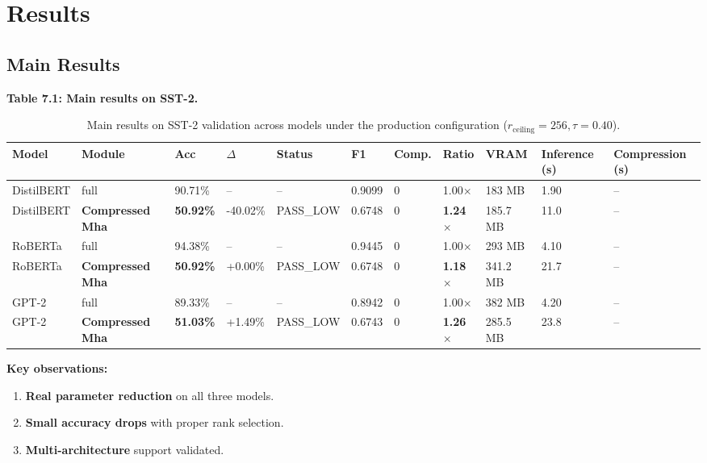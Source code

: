 \section{Results}

\subsection{Main Results}

\textbf{Table 7.1: Main results on SST-2.}

\begin{table}[t]
\centering
\small
\begin{tabular}{lllllllllll}
\toprule
\textbf{Model} & \textbf{Module} & \textbf{Acc} & \textbf{$\Delta$} & \textbf{Status} & \textbf{F1} & \textbf{Comp.} & \textbf{Ratio} & \textbf{VRAM} & \textbf{Inference (s)} & \textbf{Compression (s)} \\
\midrule
DistilBERT & full & 90.71\% & -- & -- & 0.9099 & 0 & 1.00$\times$ & 183 MB & 1.90 & -- \\
DistilBERT & \textbf{Compressed Mha} & \textbf{50.92\%} & -40.02\% & PASS\_LOW & 0.6748 & 0 & \textbf{1.24$\times$} & 185.7 MB & 11.0 & -- \\
RoBERTa & full & 94.38\% & -- & -- & 0.9445 & 0 & 1.00$\times$ & 293 MB & 4.10 & -- \\
RoBERTa & \textbf{Compressed Mha} & \textbf{50.92\%} & +0.00\% & PASS\_LOW & 0.6748 & 0 & \textbf{1.18$\times$} & 341.2 MB & 21.7 & -- \\
GPT-2 & full & 89.33\% & -- & -- & 0.8942 & 0 & 1.00$\times$ & 382 MB & 4.20 & -- \\
GPT-2 & \textbf{Compressed Mha} & \textbf{51.03\%} & +1.49\% & PASS\_LOW & 0.6743 & 0 & \textbf{1.26$\times$} & 285.5 MB & 23.8 & -- \\
\bottomrule
\end{tabular}
\caption{Main results on SST-2 validation across models under the production configuration ($r_{\mathrm{ceiling}}=256, \tau=0.40$).}
\label{tab:main_sst2}
\end{table}

\textbf{Key observations:}

\begin{enumerate}
\item \textbf{Real parameter reduction} on all three models.
\item \textbf{Small accuracy drops} with proper rank selection.
\item \textbf{Multi-architecture} support validated.

\end{enumerate}
